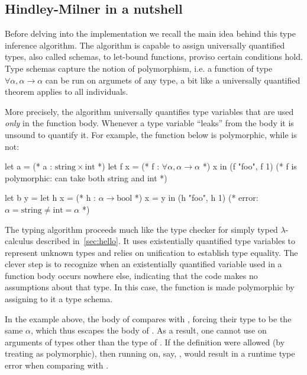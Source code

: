 \documentclass{these-ISSS}
\newenvironment{ocamlcode}
  {\VerbatimEnvironment\begin{ocamlbox}\begin{xocamlcode}}{\end{xocamlcode}
\end{ocamlbox}}
\begin{document}
\subsection{Hindley-Milner in a nutshell}


Before delving into the implementation we recall the main idea behind
this type inference algorithm. The algorithm is capable to assign
universally quantified types, also called schemas, to let-bound functions,
proviso certain conditions hold. Type schemas capture the notion of polymorphism,
i.e. a function of type $\forall \alpha, \alpha \to \alpha$ can be
run on argumets of any type, a bit like a universally quantified theorem
applies to all individuals.

More precisely, the algorithm universally quantifies type variables that are
used \emph{only} in the function body. Whenever a type variable ``leaks'' from
the body it is unsound to quantify it.
For example, the function  below is polymorphic, while  is not:
\begin{ocamlcode}
let a = (* a : $\mathrm{string} \times \mathrm{int}$ *)
  let f x = (* f : $\forall \alpha, \alpha \to \alpha$ *)
    x
  in
    (f "foo", f 1)  (* f is polymorphic: can take both string and int *)

let b y =
  let h x = (* h : $\alpha \to \mathrm{bool}$ *)
    x = y
  in
    (h "foo", h 1)  (* error: $\alpha = \mathrm{string} \not= \mathrm{int} = \alpha$ *)
\end{ocamlcode}

The typing algorithm proceeds much like the type checker for simply typed
$\lambda$-calculus described in~\cref{sec:hello}. It uses existentially
quantified type variables to represent unknown types and relies on
unification to establish type equality. The clever step is to recognize
when an existentially quantified variable used in a function body occurs
nowhere else, indicating that the code makes no assumptions about that type.
In this case, the function is made polymorphic by assigning to it a type
schema.


In the example above, the body of  compares  with ,
forcing their type to be the same $\alpha$, which thus escapes the body of
. As a result, one cannot use  on arguments of types other
than the type of .
If the definition  were allowed (by
treating  as polymorphic), then running  on, say,
, would result in a runtime type error when comparing  with
.
\end{document}
